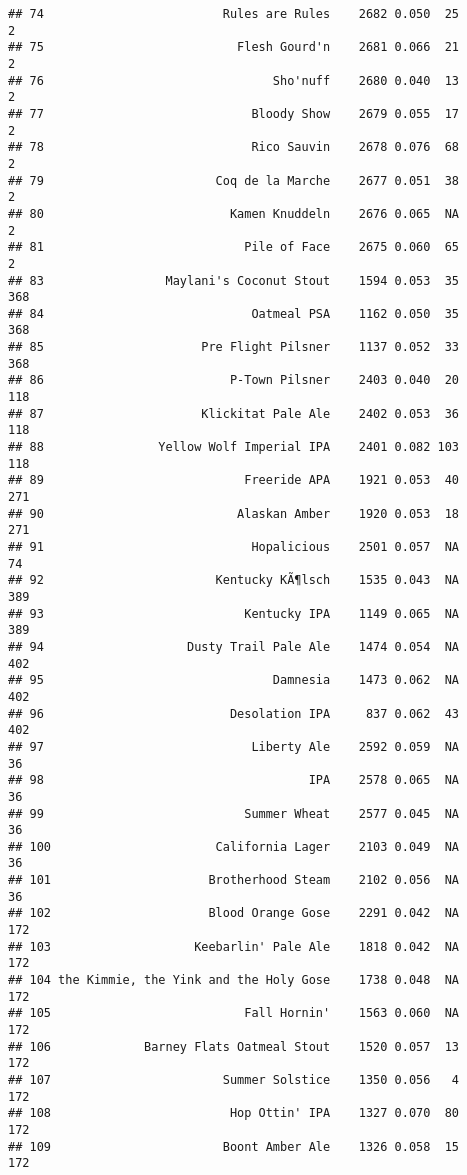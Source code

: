 \documentclass[
]{article}
\begin{document}
\begin{verbatim}
## 74                         Rules are Rules    2682 0.050  25          2
## 75                           Flesh Gourd'n    2681 0.066  21          2
## 76                                Sho'nuff    2680 0.040  13          2
## 77                             Bloody Show    2679 0.055  17          2
## 78                             Rico Sauvin    2678 0.076  68          2
## 79                        Coq de la Marche    2677 0.051  38          2
## 80                          Kamen Knuddeln    2676 0.065  NA          2
## 81                            Pile of Face    2675 0.060  65          2
## 83                 Maylani's Coconut Stout    1594 0.053  35        368
## 84                             Oatmeal PSA    1162 0.050  35        368
## 85                      Pre Flight Pilsner    1137 0.052  33        368
## 86                          P-Town Pilsner    2403 0.040  20        118
## 87                      Klickitat Pale Ale    2402 0.053  36        118
## 88                Yellow Wolf Imperial IPA    2401 0.082 103        118
## 89                            Freeride APA    1921 0.053  40        271
## 90                           Alaskan Amber    1920 0.053  18        271
## 91                             Hopalicious    2501 0.057  NA         74
## 92                        Kentucky KÃ¶lsch    1535 0.043  NA        389
## 93                            Kentucky IPA    1149 0.065  NA        389
## 94                    Dusty Trail Pale Ale    1474 0.054  NA        402
## 95                                Damnesia    1473 0.062  NA        402
## 96                          Desolation IPA     837 0.062  43        402
## 97                             Liberty Ale    2592 0.059  NA         36
## 98                                     IPA    2578 0.065  NA         36
## 99                            Summer Wheat    2577 0.045  NA         36
## 100                       California Lager    2103 0.049  NA         36
## 101                      Brotherhood Steam    2102 0.056  NA         36
## 102                      Blood Orange Gose    2291 0.042  NA        172
## 103                    Keebarlin' Pale Ale    1818 0.042  NA        172
## 104 the Kimmie, the Yink and the Holy Gose    1738 0.048  NA        172
## 105                           Fall Hornin'    1563 0.060  NA        172
## 106             Barney Flats Oatmeal Stout    1520 0.057  13        172
## 107                        Summer Solstice    1350 0.056   4        172
## 108                         Hop Ottin' IPA    1327 0.070  80        172
## 109                        Boont Amber Ale    1326 0.058  15        172

\end{verbatim}
\end{document}
